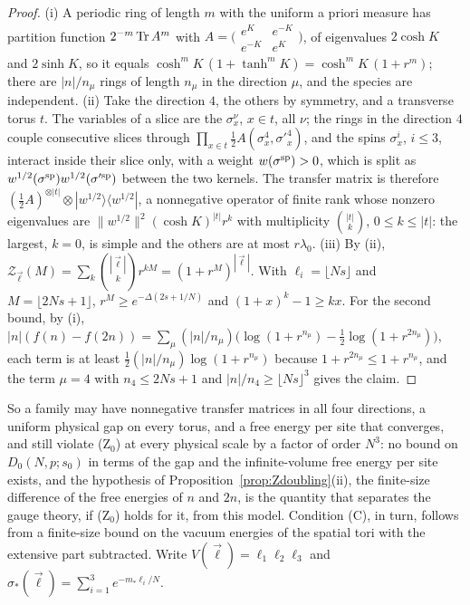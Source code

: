 \begin{proof}
(i) A periodic ring of length $m$ with the uniform a priori measure has
partition function $2^{-m}\operatorname{Tr} A^m$ with $A=\bigl(\begin{smallmatrix}e^K&
e^{-K}\\e^{-K}&e^K\end{smallmatrix}\bigr)$, of eigenvalues $2\cosh K$ and
$2\sinh K$, so it equals $\cosh^mK\,(1+\tanh^mK)=\cosh^mK\,(1+r^m)$; there
are $|n|/n_\mu$ rings of length $n_\mu$ in the direction $\mu$, and the
species are independent. (ii) Take the direction $4$, the others by
symmetry, and a transverse torus $t$. The variables of a slice are the
$\sigma^\nu_x$, $x\in t$, all $\nu$; the rings in the direction $4$ couple
consecutive slices through $\prod_{x\in t}\frac12A(\sigma^4_x,\sigma'^4_x)$,
and the spins $\sigma^i_x$, $i\le3$, interact inside their slice only, with
a weight $w(\sigma^{\rm sp})>0$, which is split as $w^{1/2}(\sigma^{\rm sp})
w^{1/2}(\sigma'^{\rm sp})$ between the two kernels. The transfer matrix is
therefore $(\frac12A)^{\otimes|t|}\otimes|w^{1/2}\rangle\langle w^{1/2}|$, a
nonnegative operator of finite rank whose nonzero eigenvalues are $\|w^{1/2}
\|^2(\cosh K)^{|t|}r^k$ with multiplicity $\binom{|t|}k$, $0\le k\le|t|$: the
largest, $k=0$, is simple and the others are at most $r\lambda_0$. (iii) By
(ii), $\mathcal Z_{\vec\ell}(M)=\sum_k\binom{|\vec\ell|}kr^{kM}=(1+r^M)^{
|\vec\ell|}$. With $\ell_i=\lfloor Ns\rfloor$ and $M=\lfloor2Ns+1\rfloor$,
$r^M\ge e^{-\Delta(2s+1/N)}$ and $(1+x)^k-1\ge kx$. For the second bound,
by (i), $|n|(f(n)-f(2n))=\sum_\mu(|n|/n_\mu)\bigl(\log(1+r^{n_\mu})-\frac12
\log(1+r^{2n_\mu})\bigr)$, each term is at least $\frac12(|n|/n_\mu)\log(1+
r^{n_\mu})$ because $1+r^{2n_\mu}\le1+r^{n_\mu}$, and the term $\mu=4$ with
$n_4\le2Ns+1$ and $|n|/n_4\ge\lfloor Ns\rfloor^3$ gives the claim.
\end{proof}

So a family may have nonnegative transfer matrices in all four directions,
a uniform physical gap on every torus, and a free energy per site that
converges, and still violate (Z$_0$) at every physical scale by a factor of
order $N^3$: no bound on $D_0(N,p;s_0)$ in terms of the gap and the
infinite-volume free energy per site exists, and the hypothesis of
Proposition~\ref{prop:Zdoubling}(ii), the finite-size difference of the
free energies of $n$ and $2n$, is the quantity that separates the gauge
theory, if (Z$_0$) holds for it, from this model. Condition (C), in turn,
follows from a finite-size bound on the vacuum energies of the spatial tori
with the extensive part subtracted. Write $V(\vec\ell)=\ell_1\ell_2\ell_3$
and $\sigma_*(\vec\ell)=\sum_{i=1}^3e^{-m_*\ell_i/N}$.

